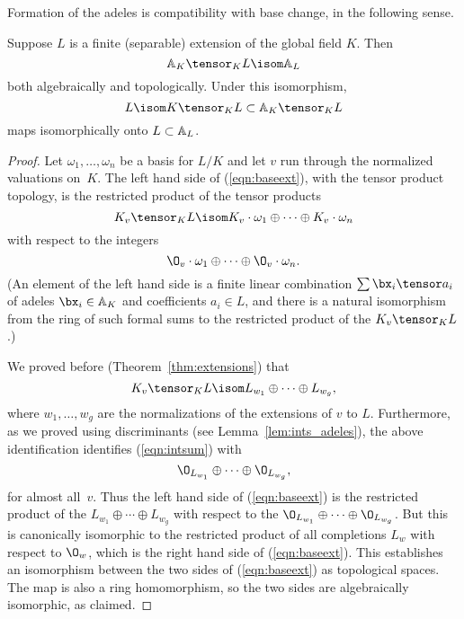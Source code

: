 Formation of the adeles is compatibility with base change, in the
following sense.
\begin{lemma}\label{lem:adelext}
  Suppose $L$ is a finite (separable) extension of the global field
  $K$.  Then
\begin{equation}\label{eqn:baseext}
  \AA_K \tensor_K L \isom \AA_L
\end{equation}
both algebraically and topologically.  Under this isomorphism,
  $$L\isom K\tensor_K L \subset \AA_K \tensor_K L$$ maps isomorphically onto
  $L\subset \AA_L$.
\end{lemma}
\begin{proof}
Let $\omega_1,\ldots, \omega_n$
be a basis for $L/K$ and let $v$ run through the normalized valuations
on~$K$.  The left hand side of (\ref{eqn:baseext}), with
the tensor product topology, is the restricted product of the
tensor products
$$
  K_v \tensor_K L \isom K_v \cdot\omega_1 \oplus \cdots \oplus K_v\cdot \omega_n
$$
with respect to the integers
\begin{equation}\label{eqn:intsum}
   \O_v\cdot \omega_1 \oplus \cdots \oplus \O_v\cdot \omega_n.
 \end{equation}
 (An element of the left hand side is a finite linear combination $\sum
\bx_i \tensor a_i$ of adeles $\bx_i \in \AA_K$ and coefficients $a_i
\in L$, and there is a natural isomorphism from the ring of such formal
sums to the restricted product of the $K_v\tensor_K L$.)

We proved before (Theorem~\ref{thm:extensions}) that
 $$
  K_v \tensor_K L \isom L_{w_1} \oplus \cdots \oplus L_{w_g},
  $$
  where $w_1,\ldots, w_g$ are the normalizations of the extensions
  of $v$ to $L$.  Furthermore, as we proved using discriminants (see
  Lemma~\ref{lem:ints_adeles}), the above identification identifies
  (\ref{eqn:intsum}) with
$$
 \O_{L_{w_1}} \oplus \cdots \oplus \O_{L_{w_g}},
$$
for almost all~$v$.
Thus the left hand side of (\ref{eqn:baseext}) is the restricted
product of the $L_{w_1} \oplus \cdots \oplus L_{w_g}$
with respect to the $\O_{L_{w_1}} \oplus \cdots \oplus \O_{L_{w_g}}$.
But this is canonically isomorphic to the restricted product
of all completions $L_w$ with respect to $\O_w$, which
is the right hand side of (\ref{eqn:baseext}).  This 
establishes an isomorphism between the two sides of (\ref{eqn:baseext})
as topological spaces.  The map is also a ring homomorphism, so 
the two sides are algebraically isomorphic, as claimed.
\end{proof}

